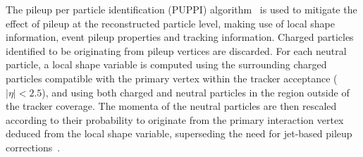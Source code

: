 The pileup per particle identification (PUPPI) algorithm~\cite{Bertolini:2014bba} is used to mitigate the effect of pileup at the reconstructed particle level, making use of local shape information, event pileup properties and tracking information. Charged particles identified to be originating from pileup vertices are discarded. For each neutral particle, a local shape variable is computed using the surrounding charged particles compatible with the primary vertex within the tracker acceptance ($|\eta| < 2.5$), and using both charged and neutral particles in the region outside of the tracker coverage. The momenta of the neutral particles are then rescaled according to their probability to originate from the primary interaction vertex deduced from the local shape variable, superseding the need for jet-based pileup corrections~\cite{CMS-PAS-JME-16-003}. 




